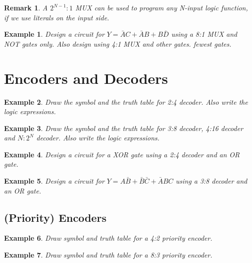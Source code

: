 \documentclass{article}
\newtheorem{example}{Example}
\newtheorem{remark}{Remark}
\newcommand{\bA}{\bar{A}}
\newcommand{\bB}{\bar{B}}
\newcommand{\bC}{\bar{C}}
\newcommand{\bD}{\bar{D}}
\begin{document}
\begin{remark}
  A $2^{N-1}:1$ MUX can be used to program any N-input logic function, if we use
  literals on the input side.
\end{remark}

\begin{example}
  Design a circuit for $Y = \bA C + \bA B + B \bD $ using a 8:1 MUX and NOT
  gates only. Also design using 4:1 MUX and other gates.
   fewest gates.
\end{example}
\vspace{10em}

\section{Encoders and Decoders}

\begin{example}
Draw the symbol and the truth table for 2:4 decoder. Also write the logic expressions.
\end{example}
\vspace{10em}

\begin{example}
  Draw the symbol and the truth table for 3:8 decoder, 4:16 decoder and $N:2^N$ decoder. Also write the logic expressions.
\end{example}
\vspace{10em}

\begin{example}
Design a circuit for a XOR gate using a 2:4 decoder and an OR gate.
\end{example}
\vspace{10em}

\begin{example}
  Design a circuit for $Y = A\bB + \bB \bC + \bA B C$ using a 3:8 decoder and an
  OR gate.
\end{example}
\vspace{10em}


\subsection{(Priority) Encoders}

\begin{example}
  Draw symbol and truth table for a 4:2 priority encoder. 
\end{example}
\vspace{10em}

\begin{example}
  Draw symbol and truth table for a 8:3 priority encoder. 
\end{example}
\vspace{10em}



\end{document}
